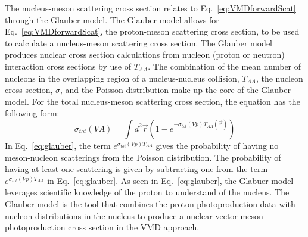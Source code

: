     The nucleus-meson scattering cross section relates to 
      Eq.~\ref{eq:VMDforwardScat} through the Glauber model. 
    The Glauber model allows for Eq.~\ref{eq:VMDforwardScat}, the proton-meson
      scattering cross section, to be used to calculate a nucleus-meson 
      scattering cross section. 
    The Glauber model produces nuclear cross section calculations from 
      nucleon (proton or neutron) interaction cross sections by use of $T_{AA}$. 
    The combination of the mean number of nucleons in the overlapping region
      of a nucleus-nucleus collision, $T_{AA}$, the nucleon cross section, 
      $\sigma$, and the Poisson distribution make-up the core of the Glauber 
      model. 
    For the total nucleus-meson scattering cross section, the equation has the 
      following form:
    \begin{equation} \label{eq:glauber}
      \sigma_{tot}(VA)=\int d^{2}\vec{r}(1-e^{-\sigma_{tot}(Vp)T_{AA}(\vec{r})})
    \end{equation}
    In Eq.~\ref{eq:glauber}, the term $e^{\sigma_{tot}(Vp)T_{AA}}$ gives the
      probability of having no meson-nucleon scatterings from the Poisson 
      distribution. 
    The probability of having at least one scattering is given by subtracting 
      one from the term  $e^{\sigma_{tot}(Vp)T_{AA}}$ in Eq.~\ref{eq:glauber}.
    As seen in Eq.~\ref{eq:glauber}, the Glabuer model leverages scientific 
      knowledge of the proton to understand of the nucleus. 
    The Glauber model is the tool that combines the proton photoproduction data 
      with nucleon distributions in the nucleus to produce a nuclear vector 
      meson photoproduction cross section in the VMD approach. 

